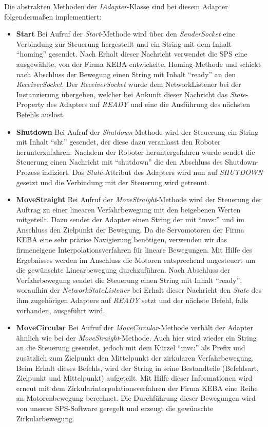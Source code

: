 Die abstrakten Methoden der \textit{IAdapter}-Klasse sind bei diesem Adapter folgendermaßen implementiert:
\begin{itemize}
\item \textbf{Start}
\newline
Bei Aufruf der \textit{Start}-Methode wird über den \textit{SenderSocket} eine Verbindung zur Steuerung hergestellt und ein String mit dem Inhalt “homing” gesendet. Nach Erhalt dieser Nachricht verwendet die SPS eine ausgewählte, von der Firma KEBA entwickelte, Homing-Methode und schickt nach Abschluss der Bewegung einen String mit Inhalt “ready” an den \textit{ReceiverSocket}. Der \textit{ReceiverSocket} wurde dem NetworkListener bei der Instanzierung übergeben, welcher bei Ankunft dieser Nachricht das \textit{State}-Property des Adapters auf \textit{READY} und eine die Ausführung des nächsten Befehls auslöst.
\item \textbf{Shutdown}
\newline
Bei Aufruf der \textit{Shutdown}-Methode wird der Steuerung ein String mit Inhalt “sht” gesendet, der diese dazu veranlasst den Roboter herunterzufahren. Nachdem der Roboter heruntergefahren wurde sendet die Steuerung einen Nachricht mit “shutdown” die den Abschluss des Shutdown-Prozess indiziert. Das \textit{State}-Attribut des Adapters wird nun auf \textit{SHUTDOWN} gesetzt und die Verbindung mit der Steuerung wird getrennt.
\item \textbf{MoveStraight}
\newline
Bei Aufruf der \textit{MoveStraight}-Methode wird der Steuerung der Auftrag zu einer linearen Verfahrbewegung mit den beigebenen Werten mitgeteilt. Dazu sendet der Adapter einen String der mit “mvs:” und im Anschluss den Zielpunkt der Bewegung. Da die Servomotoren der Firma KEBA eine sehr präzise Navigierung benötigen, verwenden wir das firmeneigene Interpolationsverfahren für lineare Bewegungen. Mit Hilfe des Ergebnisses werden im Anschluss die Motoren entsprechend angesteuert um die gewünschte Linearbewegung durchzuführen. Nach Abschluss der Verfahrbewegung sendet die Steuerung einen String mit Inhalt “ready”, woraufhin der \textit{NetworkStateListener} bei Erhalt dieser Nachricht den \textit{State} des ihm zugehörigen Adapters auf \textit{READY} setzt und der nächste Befehl, falls vorhanden, ausgeführt wird.
\item \textbf{MoveCircular}
\newline
Bei Aufruf der \textit{MoveCircular}-Methode verhält der Adapter ähnlich wie bei der \textit{MoveStraight}-Methode. Auch hier wird wieder ein String an die Steuerung gesendet, jedoch mit dem Kürzel “mvc:” als Prefix und zusätzlich zum Zielpunkt den Mittelpunkt der zirkularen Verfahrbewegung. Beim Erhalt dieses Befehls, wird der String in seine Bestandteile (Befehlsart, Zielpunkt und Mittelpunkt) aufgeteilt. Mit Hilfe dieser Informationen wird erneut mit dem Zirkularinterpolationsverfahren der Firma KEBA eine Reihe an Motorenbewegung berechnet. Die Durchführung dieser Bewegungen wird von unserer SPS-Software geregelt und erzeugt die gewünschte Zirkularbewegung. 

\end{itemize}
